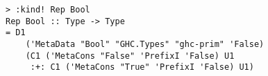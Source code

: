 \begin{repl}\begin{lstlisting}
> :kind! Rep Bool
Rep Bool :: Type -> Type
= D1
    ('MetaData "Bool" "GHC.Types" "ghc-prim" 'False)
    (C1 ('MetaCons "False" 'PrefixI 'False) U1
     :+: C1 ('MetaCons "True" 'PrefixI 'False) U1)\end{lstlisting}\end{repl}
